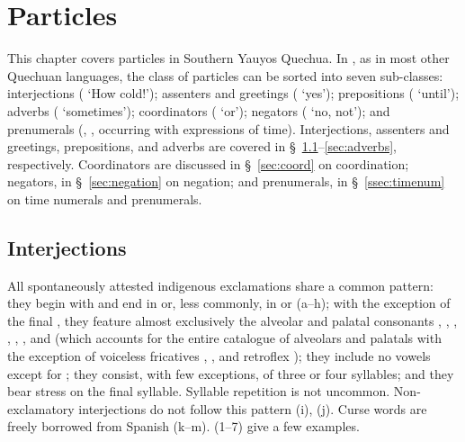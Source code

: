 \chapter{Particles}\label{ch:particles}
This chapter covers particles in Southern Yauyos Quechua. In \SYQ{}, as in most other Quechuan languages, the class of particles can be sorted into seven sub-classes: interjections ( `How cold!'); assenters and greetings ( `yes'); prepositions ( `until'); adverbs ( `sometimes'); coordinators ( `or'); negators ( `no, not'); and prenumerals (, , occurring with expressions of time). Interjections, assenters and greetings, prepositions, and adverbs are covered in \S~\ref{sec:interjections}--\ref{sec:adverbs}, respectively. Coordinators are discussed in \S~\ref{sec:coord} on coordination; negators, in \S~\ref{sec:negation} on negation; and prenumerals, in \S~\ref{ssec:timenum}  on time numerals and prenumerals.

\section{Interjections}\label{sec:interjections}
All spontaneously attested indigenous exclamations share a common pattern: they begin with  and end in  or, less commonly, in  or  (a--h); with the exception of the final , they feature almost exclusively the alveolar and palatal consonants , , , , , , and  (which accounts for the entire catalogue of \SYQ{} alveolars and palatals with the exception of voiceless fricatives , , and retroflex ); they include no vowels except for ; they consist, with few exceptions, of three or four syllables; and they bear stress on the final syllable. Syllable repetition is not uncommon. Non-exclamatory interjections do not follow this pattern (i), (j). Curse words are freely borrowed from Spanish (k--m). (1--7) give a few examples.

\begin{examplent}
\end{examplent}

